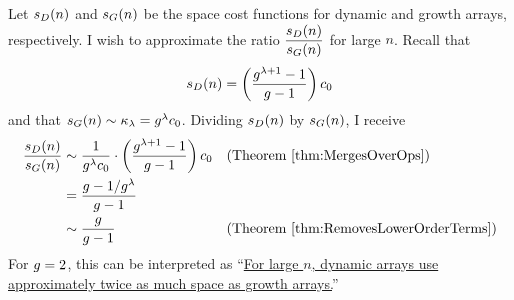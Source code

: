 Let $s_D(n)$ and $s_G(n)$ be the space cost functions for dynamic and growth arrays, respectively. I wish to approximate the ratio $\dfrac{s_D(n)}{s_G(n)}$ for large $n$. Recall that
\begin{align*}
s_D(n) = \left( \frac{g^{\lambda + 1} - 1}{g - 1} \right) c_0
\end{align*}
and that $s_G(n) \sim \kappa_\lambda = g^\lambda c_0$. Dividing $s_D(n)$ by $s_G(n)$, I receive
\begin{align*}
\frac{s_D(n)}{s_G(n)} &\sim \frac{1}{g^\lambda c_0} \cdot \left( \frac{g^{\lambda + 1} - 1}{g - 1} \right) c_0 &&\text{(Theorem \ref{thm:MergesOverOps})}\\
&= \frac{g - 1 / {g^\lambda}}{g - 1}\\
&\sim \frac{g}{g - 1} &&\text{(Theorem \ref{thm:RemovesLowerOrderTerms})}
\end{align*}
For $g = 2$, this can be interpreted as ``\underline{For large $n$, dynamic arrays use approximately twice as much space as growth arrays.}''